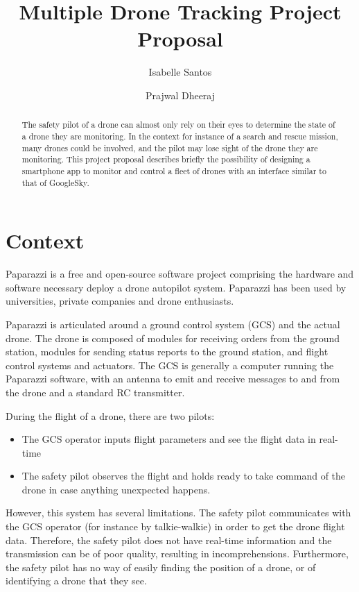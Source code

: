 \documentclass[10pt,letterpaper]{article}
\author{Isabelle Santos \and Prajwal Dheeraj}
\title{Multiple Drone Tracking Project Proposal}
\begin{document}
\maketitle
\begin{abstract}
The safety pilot of a drone can almost only rely on their eyes to determine the state of a drone they are monitoring. In the context for instance of a search and rescue mission, many drones could be involved, and the pilot may lose sight of the drone they are monitoring. This project proposal describes briefly the possibility of designing a smartphone app to monitor and control a fleet of drones with an interface similar to that of GoogleSky.
\end{abstract}

\section{Context}
Paparazzi is a free and open-source software project \cite{Paparazzi} comprising the hardware and software necessary deploy a drone autopilot system. Paparazzi has been used by universities, private companies and drone enthusiasts. 

Paparazzi is articulated around a ground control system (GCS) and the actual drone. The drone is composed of modules for receiving orders from the ground station, modules for sending status reports to the ground station, and flight control systems and actuators. The GCS is generally a computer running the Paparazzi software, with an antenna to emit and receive messages to and from the drone and a standard RC transmitter. 

During the flight of a drone, there are two pilots:
\begin{itemize}
\item The GCS operator inputs flight parameters and see the flight data in real-time
\item The safety pilot observes the flight and holds ready to take command of the drone in case anything unexpected happens. 
\end{itemize}

However, this system has several limitations. The safety pilot communicates with the GCS operator (for instance by talkie-walkie) in order to get the drone flight data. Therefore, the safety pilot does not have real-time information and the transmission can be of poor quality, resulting in incomprehensions. Furthermore, the safety pilot has no way of easily finding the position of a drone, or of identifying a drone that they see. 
\end{document}
